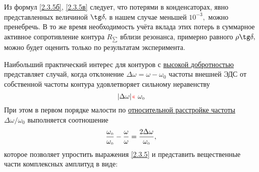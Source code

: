 Из формул \eqref{2.3.5б}, \eqref{2.3.5в} следует, что потерями в конденсаторах, явно представленных величиной $\tg\delta,$ в нашем случае меньшей $10^{-3},$ можно пренебречь. В то же время необходимость учёта вклада этих потерь в суммарное активное сопротивление контура $R_{\scriptscriptstyle{\sum}}$ вблизи резонанса, примерно равного $\rho\tg\delta,$ можно будет оценить только по результатам эксперимента.

Наибольший практический интерес для контуров с \underline{высокой добротностью} представляет случай, когда отклонение $\Delta\omega=\omega-\omega_{\scriptscriptstyle{0}}$ частоты внешней ЭДС от собственной частоты контура удовлетворяет сильному неравенству
\begin{equation}\eqmark{2.3.6}
|\Delta\omega|\textcolor{red}{\text{<<}}~\omega_{\scriptscriptstyle{0}}
\end{equation}
При этом в первом порядке малости по \underline{относительной расстройке частоты} $\Delta\omega/\omega_{\scriptscriptstyle{0}}$ выпол\-няется соотношение
\begin{equation}\eqmark{2.3.7}
\dfrac{\omega_{\scriptscriptstyle{0}}}{\omega_{\scriptscriptstyle{0}}}-\dfrac{\omega}{\omega}=\dfrac{2\Delta\omega}{\omega_{\scriptscriptstyle{0}}},
\end{equation}
которое позволяет упростить выражения \eqref{2.3.5} и представить вещественные части комплексных амплитуд в виде:
